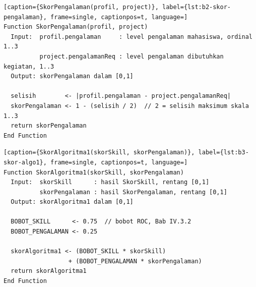 \begin{minipage}{\textwidth}
\begin{lstlisting}[caption={SkorPengalaman(profil, project)}, label={lst:b2-skor-pengalaman}, frame=single, captionpos=t, language=]
Function SkorPengalaman(profil, project)
  Input:  profil.pengalaman     : level pengalaman mahasiswa, ordinal 1..3
          project.pengalamanReq : level pengalaman dibutuhkan kegiatan, 1..3
  Output: skorPengalaman dalam [0,1]

  selisih        <- |profil.pengalaman - project.pengalamanReq|
  skorPengalaman <- 1 - (selisih / 2)  // 2 = selisih maksimum skala 1..3
  return skorPengalaman
End Function
\end{lstlisting}
\end{minipage}

\begin{minipage}{\textwidth}
\begin{lstlisting}[caption={SkorAlgoritma1(skorSkill, skorPengalaman)}, label={lst:b3-skor-algo1}, frame=single, captionpos=t, language=]
Function SkorAlgoritma1(skorSkill, skorPengalaman)
  Input:  skorSkill      : hasil SkorSkill, rentang [0,1]
          skorPengalaman : hasil SkorPengalaman, rentang [0,1]
  Output: skorAlgoritma1 dalam [0,1]

  BOBOT_SKILL      <- 0.75  // bobot ROC, Bab IV.3.2
  BOBOT_PENGALAMAN <- 0.25

  skorAlgoritma1 <- (BOBOT_SKILL * skorSkill)
                  + (BOBOT_PENGALAMAN * skorPengalaman)
  return skorAlgoritma1
End Function
\end{lstlisting}
\end{minipage}

